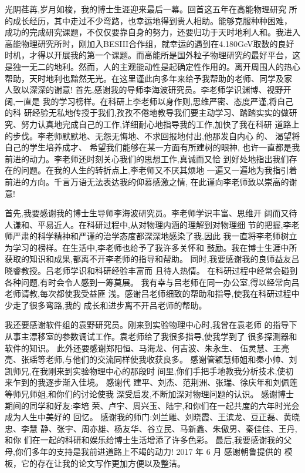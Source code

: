 \begin{acknowledgements}
光阴荏苒,岁月如梭，我的博士生涯迎来最后一幕。回首这五年在高能物理研究
所的成长经历，其中走过不少弯路，也幸运地得到贵人相助。能够克服种种困难，
成功的完成研究课题，不仅仅要靠自身的努力，还要归功于天时地利人和。我进入
高能物理研究所时，刚加入BESIII合作组，就幸运的遇到在4.180GeV取数的良好
时机，才得以开展我的第一个课题。而高能所是国外粒子物理研究的最好平台，这
是独一无二的地利。然而，人的主观能动性是起确定性作用的。离开周围人的热心
帮助，天时地利也黯然无光。在这里谨此向多年来给予我帮助的老师、同学及家
人致以深深的谢意!
首先,感谢我的导师李海波研究员。李老师学识渊博、视野开阔,一直是
我的学习榜样。在科研上李老师以身作则,思维严密、态度严谨,将自己的科
研经验无私地传授于我们,孜孜不倦地教导我们要主动学习、踏踏实实的做研
究、努力认真地完成自己的工作,详细耐心地指导我的工作,加快了我在科研
道路上的步伐。李老师默默地、无怨无悔地、不求回报地付出,他那发自内心
的、 渴望将自己的学生培养成才、 希望我们能够在某一方面有所建树的眼神,
也许一直都是我前进的动力。李老师还时刻关心我们的思想工作,真诚而又恰
到好处地指出我们存在的问题。在我的人生的转折点上,李老师又不厌其烦地
一遍又一遍地为我指引着前进的方向。千言万语无法表达我的仰慕感激之情,
在此谨向李老师致以崇高的谢意!

首先,我要感谢我的博士生导师李海波研究员。李老师学识丰富、思维开
阔而又待人谦和、平易近人。在科研过程中,从对物理内涵的理解到对物理细
节的把握,李老师严肃的科学精神和严谨的治学态度都深深地感染了我,因此
我一直将李老师树立为学习的榜样。在生活中,李老师也给予了我许多关怀和
鼓励。我在博士生涯中所获取的知识和成果,都离不开李老师的指导和帮助。
同时,我要感谢我的良师益友吕晓睿教授。吕老师学识和科研经验丰富而
且待人热情。 在科研过程中经常会碰到各种问题,有时会令人感到一筹莫展。
我有幸与吕老师在同一办公室,得以经常向吕老师请教,每次都使我受益匪
浅。感谢吕老师细致的帮助和指导,使我在科研过程中少走了很多弯路,我的
成长和进步离不开吕老师的帮助。


我还要感谢软件组的袁野研究员。刚来到实验物理中心时,我曾在袁老师
的指导下从事主漂移室的参数调试工作。袁老师给了我很多指导,使我学到了
很多探测器和软件的知识。 此外还要感谢郑阳恒、马海龙、何吉波、朱永生、
伍灵慧、王亮亮、张瑶等老师,与他们的交流同样使我收获良多。
感谢管颖慧师姐和秦小帅、刘凯师兄,在我刚来到实验物理中心的那段时
间里,你们手把手地教我分析技术,使初来乍到的我逐步渐入佳境。 感谢代
建平、刘杰、范荆洲、张瑞、徐庆年和刘佩莲等师兄师姐,和你们的讨论使我
深受启发,不断加深对物理问题的认识。 感谢博士期间的同学和好友:李培
荣、卢宇、周兴玉、陆宇,和你们在一起共度的六年时光会成为人生中美好的
回忆。
感谢我的师门:刘兰雕、刘晓霞、王滨龙、豆正磊、黄晓忠、李慧
静、张宇、周亦雄、杨友华、谷立民、马新鑫、朱傲男、秦佳佳、王丹,和你
们在一起的科研和娱乐给博士生活增添了许多色彩。
最后,我要感谢我的父母,你们多年的支持是我前进道路上不竭的动力!
2017 年 6 月
感谢朝鲁提供的 \ucasthesis 模板，它的存在让我的论文写作更加方便以及整洁。

\end{acknowledgements}
